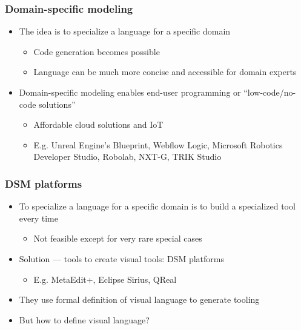 \documentclass{slides-style}
\begin{document}
    \begin{frame}
        \frametitle{Domain-specific modeling}
        \begin{itemize}
            \item The idea is to specialize a language for a specific domain
            \begin{itemize}
                \item Code generation becomes possible
                \item Language can be much more concise and accessible for domain experts
            \end{itemize}
            \item Domain-specific modeling enables end-user programming or ``low-code/no-code solutions''
            \begin{itemize}
                \item Affordable cloud solutions and IoT
                \item E.g. Unreal Engine's Blueprint, Webflow Logic, Microsoft Robotics Developer Studio, Robolab, NXT-G, TRIK Studio
            \end{itemize}
        \end{itemize}
    \end{frame}

    \begin{frame}
        \frametitle{DSM platforms}
        \begin{itemize}
            \item To specialize a language for a specific domain is to build a specialized tool every time
            \begin{itemize}
                \item Not feasible except for very rare special cases
            \end{itemize}
            \item Solution --- tools to create visual tools: DSM platforms
            \begin{itemize}
                \item E.g. MetaEdit+, Eclipse Sirius, QReal
            \end{itemize}
            \item They use formal definition of visual language to generate tooling
            \item But how to define visual language?
        \end{itemize}
    \end{frame}
\end{document}
